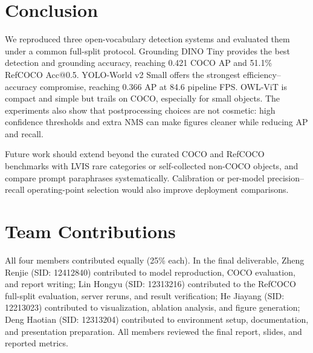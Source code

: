 \documentclass[conference]{IEEEtran}
\begin{document}
\section{Conclusion}

We reproduced three open-vocabulary detection systems and evaluated them under
a common full-split protocol. Grounding DINO Tiny provides the best detection
and grounding accuracy, reaching 0.421 COCO AP and 51.1\% RefCOCO Acc@0.5.
YOLO-World v2 Small offers the strongest efficiency--accuracy compromise,
reaching 0.366 AP at 84.6 pipeline FPS. OWL-ViT is compact and simple but
trails on COCO, especially for small objects. The experiments also show that
postprocessing choices are not cosmetic: high confidence thresholds and extra
NMS can make figures cleaner while reducing AP and recall.

Future work should extend beyond the curated COCO and RefCOCO benchmarks with
LVIS rare categories or self-collected non-COCO objects, and compare prompt
paraphrases systematically. Calibration or per-model precision--recall
operating-point selection would also improve deployment comparisons.

\section*{Team Contributions}

All four members contributed equally (25\% each). In the final deliverable,
Zheng Renjie (SID: 12412840) contributed to model reproduction, COCO
evaluation, and report writing; Lin Hongyu (SID: 12313216) contributed to the
RefCOCO full-split evaluation, server reruns, and result verification; He
Jiayang (SID: 12213023) contributed to visualization, ablation analysis, and
figure generation; Deng Haotian (SID: 12313204) contributed to environment
setup, documentation, and presentation preparation. All members reviewed the
final report, slides, and reported metrics.

\balance


\end{document}
